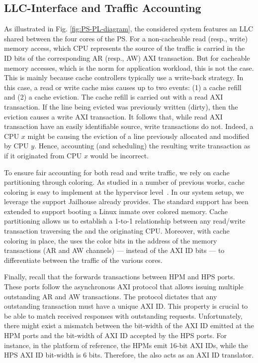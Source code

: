 \subsection{LLC-\schim Interface and Traffic Accounting}
As illustrated in Fig. \ref{fig:PS-PL-diagram}, the considered system
features an LLC shared between the four cores of the PS. For a
non-cacheable read (resp., write) memory access, which CPU represents
the source of the traffic is carried in the ID bits of the
corresponding AR (resp., AW) AXI transaction. But for cacheable memory
accesses, which is the norm for application workload, this is not the
case. This is mainly because cache controllers typically use a
write-back strategy. In this case, a read or write cache miss causes
up to two events: (1) a cache refill and (2) a cache eviction. The
cache refill is carried out with a read AXI transaction. If the line
being evicted was previously written (dirty), then the eviction causes
a write AXI transaction. It follows that, while read AXI transaction
have an easily identifiable source, write transactions do not. Indeed,
a CPU $x$ might be causing the eviction of a line previously allocated
and modified by CPU $y$. Hence, accounting (and scheduling) the
resulting write transaction as if it originated from CPU $x$ would be
incorrect.

To ensure fair accounting for both read and write traffic, we rely on
cache partitioning through coloring. As studied in a number of
previous works, cache coloring is easy to implement at the hypervisor
level~\cite{biondi_xvisor, cmu_virtpart, detvrt_rtas19}. In our system
setup, we leverage the support Jailhouse already provides. The
standard support has been extended to support booting a Linux inmate
over colored memory. Cache partitioning allows us to establish a
1-to-1 relationship between any read/write transaction traversing the
\schim and the originating CPU. Moreover, with cache coloring in
place, the \schim uses the color bits in the address of the memory
transactions (AR and AW channels) --- instead of the AXI ID bits ---
to differentiate between the traffic of the various cores.

Finally, recall that the \schim forwards transactions between HPM and
HPS ports. These ports follow the asynchronous AXI protocol that
allows issuing multiple outstanding AR and AW transactions. The
protocol dictates that any outstanding transaction must have a unique
AXI ID. This property is crucial to be able to match received
responses with outstanding requests. Unfortunately, there might exist
a mismatch between the bit-width of the AXI ID emitted at the HPM
ports and the bit-width of AXI ID accepted by the HPS ports. For
instance, in the platform of reference, the HPMs emit 16-bit AXI IDs,
while the HPS AXI ID bit-width is 6 bits. Therefore, the \schim also
acts as an AXI ID translator.

